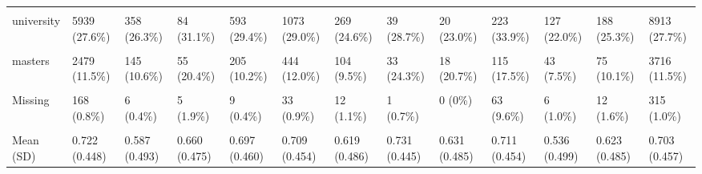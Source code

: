 \documentclass[
  single column]{article}
\begin{document}
\begin{landscape}
\begin{longtable}[t]{lllllllllllll}
\addlinespace
\cellcolor{gray!10}{cert\_5\_to\_6} & \cellcolor{gray!10}{2659 (12.3\%)} & \cellcolor{gray!10}{209 (15.3\%)} & \cellcolor{gray!10}{24 (8.9\%)} & \cellcolor{gray!10}{279 (13.8\%)} & \cellcolor{gray!10}{554 (15.0\%)} & \cellcolor{gray!10}{176 (16.1\%)} & \cellcolor{gray!10}{10 (7.4\%)} & \cellcolor{gray!10}{7 (8.0\%)} & \cellcolor{gray!10}{32 (4.9\%)} & \cellcolor{gray!10}{94 (16.3\%)} & \cellcolor{gray!10}{106 (14.2\%)} & \cellcolor{gray!10}{4150 (12.9\%)}\\
university & 5939 (27.6\%) & 358 (26.3\%) & 84 (31.1\%) & 593 (29.4\%) & 1073 (29.0\%) & 269 (24.6\%) & 39 (28.7\%) & 20 (23.0\%) & 223 (33.9\%) & 127 (22.0\%) & 188 (25.3\%) & 8913 (27.7\%)\\
\cellcolor{gray!10}{post\_grad} & \cellcolor{gray!10}{3120 (14.5\%)} & \cellcolor{gray!10}{176 (12.9\%)} & \cellcolor{gray!10}{39 (14.4\%)} & \cellcolor{gray!10}{276 (13.7\%)} & \cellcolor{gray!10}{565 (15.3\%)} & \cellcolor{gray!10}{129 (11.8\%)} & \cellcolor{gray!10}{26 (19.1\%)} & \cellcolor{gray!10}{13 (14.9\%)} & \cellcolor{gray!10}{39 (5.9\%)} & \cellcolor{gray!10}{58 (10.1\%)} & \cellcolor{gray!10}{87 (11.7\%)} & \cellcolor{gray!10}{4528 (14.1\%)}\\
masters & 2479 (11.5\%) & 145 (10.6\%) & 55 (20.4\%) & 205 (10.2\%) & 444 (12.0\%) & 104 (9.5\%) & 33 (24.3\%) & 18 (20.7\%) & 115 (17.5\%) & 43 (7.5\%) & 75 (10.1\%) & 3716 (11.5\%)\\
\cellcolor{gray!10}{doctorate} & \cellcolor{gray!10}{835 (3.9\%)} & \cellcolor{gray!10}{42 (3.1\%)} & \cellcolor{gray!10}{24 (8.9\%)} & \cellcolor{gray!10}{54 (2.7\%)} & \cellcolor{gray!10}{158 (4.3\%)} & \cellcolor{gray!10}{47 (4.3\%)} & \cellcolor{gray!10}{8 (5.9\%)} & \cellcolor{gray!10}{8 (9.2\%)} & \cellcolor{gray!10}{57 (8.7\%)} & \cellcolor{gray!10}{4 (0.7\%)} & \cellcolor{gray!10}{9 (1.2\%)} & \cellcolor{gray!10}{1246 (3.9\%)}\\
\addlinespace
Missing & 168 (0.8\%) & 6 (0.4\%) & 5 (1.9\%) & 9 (0.4\%) & 33 (0.9\%) & 12 (1.1\%) & 1 (0.7\%) & 0 (0\%) & 63 (9.6\%) & 6 (1.0\%) & 12 (1.6\%) & 315 (1.0\%)\\
\cellcolor{gray!10}{Employment Status (Employed/Unemployed)} & \cellcolor{gray!10}{} & \cellcolor{gray!10}{} & \cellcolor{gray!10}{} & \cellcolor{gray!10}{} & \cellcolor{gray!10}{} & \cellcolor{gray!10}{} & \cellcolor{gray!10}{} & \cellcolor{gray!10}{} & \cellcolor{gray!10}{} & \cellcolor{gray!10}{} & \cellcolor{gray!10}{} & \cellcolor{gray!10}{}\\
Mean (SD) & 0.722 (0.448) & 0.587 (0.493) & 0.660 (0.475) & 0.697 (0.460) & 0.709 (0.454) & 0.619 (0.486) & 0.731 (0.445) & 0.631 (0.485) & 0.711 (0.454) & 0.536 (0.499) & 0.623 (0.485) & 0.703 (0.457)\\

\end{longtable}
\end{landscape}
\end{document}
